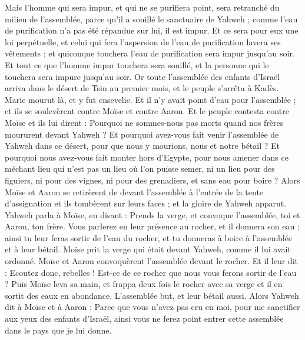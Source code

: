 \begin{multicols}{2}
Mais l'homme qui sera impur, et qui ne se purifiera point, sera retranché du milieu de l'assemblée, parce qu'il a souillé le sanctuaire de Yahweh ; comme l'eau de purification n'a pas été répandue sur lui, il est impur.
Et ce sera pour eux une loi perpétuelle, et celui qui fera l'aspersion de l'eau de purification lavera ses vêtements ; et quiconque touchera l'eau de purification sera impur jusqu'au soir.
Et tout ce que l'homme impur touchera sera souillé, et la personne qui le touchera sera impure jusqu'au soir.
\VerseOne{}Or toute l'assemblée des enfants d'Israël arriva dans le désert de Tsin au premier mois, et le peuple s'arrêta à Kadès. Marie mourut là, et y fut ensevelie.
Et il n'y avait point d'eau pour l'assemblée ; et ils se soulevèrent contre Moïse et contre Aaron.
Et le peuple contesta contre Moïse et ils lui dirent : Pourquoi ne sommes-nous pas morts quand nos frères moururent devant Yahweh ?
Et pourquoi avez-vous fait venir l'assemblée de Yahweh dans ce désert, pour que nous y mourions, nous et notre bétail ?
Et pourquoi nous avez-vous fait monter hors d'Egypte, pour nous amener dans ce méchant lieu qui n'est pas un lieu où l'on puisse semer, ni un lieu pour des figuiers, ni pour des vignes, ni pour des grenadiers, et sans eau pour boire ?
Alors Moïse et Aaron se retirèrent de devant l'assemblée à l'entrée de la tente d'assignation et ils tombèrent sur leurs faces ; et la gloire de Yahweh apparut.
Yahweh parla à Moïse, en disant :
Prends la verge, et convoque l'assemblée, toi et Aaron, ton frère. Vous parlerez en leur présence au rocher, et il donnera son eau ; ainsi tu leur feras sortir de l'eau du rocher, et tu donneras à boire à l'assemblée et à leur bétail.
Moïse prit la verge qui était devant Yahweh, comme il lui avait ordonné.
Moïse et Aaron convoquèrent l'assemblée devant le rocher. Et il leur dit : Ecoutez donc, rebelles ! Est-ce de ce rocher que nous vous ferons sortir de l'eau ?
Puis Moïse leva sa main, et frappa deux fois le rocher avec sa verge et  il en sortit des eaux en abondance. L'assemblée but, et leur bétail aussi.
Alors Yahweh dit à Moïse et à Aaron : Parce que vous n'avez pas cru en moi, pour me sanctifier aux yeux des enfants d'Israël, ainsi vous ne ferez point entrer cette assemblée dans le pays que je lui donne.

\end{multicols}
